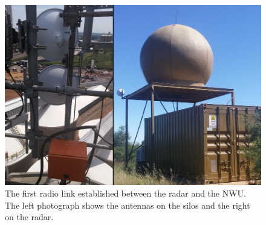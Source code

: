 \documentclass{wrcreport}
\begin{document}
\begin{figure}[!htp]
\includegraphics[width=\textwidth]{comlink1.jpg} \caption[The first
radio link established between the radar and the NWU.]{The first radio
link established between the radar and the NWU. The left photograph
shows the antennas on the silos and the right on the radar.}
\label{fig:link1}
\end{figure}
\end{document}
